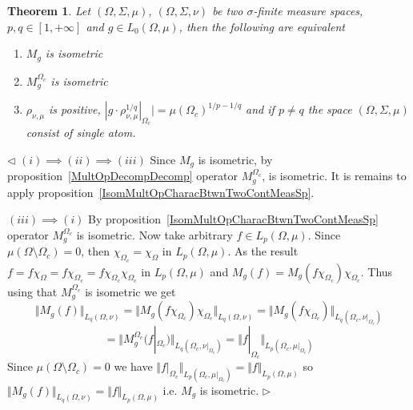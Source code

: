 \documentclass[12pt]{article}
\newtheorem{theorem}{Theorem}[subsection]
\newenvironment{proof}{\par $\triangleleft$}{$\triangleright$}
\begin{document}
\begin{theorem}\label{IsomMultOpCharacBtwnTwoMeasSp}
    Let $(\Omega,\Sigma,\mu)$, $(\Omega,\Sigma,\nu)$ be two $\sigma$-finite
    measure spaces, $p,q\in[1,+\infty]$ and $g\in L_0(\Omega,\mu)$, then the
    following are equivalent
    \begin{enumerate}[label = (\roman*)]
        \item $M_g$ is isometric

        \item $M_g^{\Omega_c}$ is isometric

        \item $\rho_{\nu,\mu}$ is positive,
              $|g\cdot \rho_{\nu,\mu}^{1/q}|_{\Omega_c}|={\mu(\Omega_c)}^{1/p-1/q}$
              and if  $p\neq q$ the space $(\Omega,\Sigma,\mu)$ consist
              of single atom.
    \end{enumerate}
\end{theorem}
\begin{proof}
    $(i)\implies (ii)\implies (iii)$ Since $M_g$ is isometric, by
    proposition~\ref{MultOpDecompDecomp} operator $M_g^{\Omega_c}$, is
    isometric. It is remains to apply
    proposition~\ref{IsomMultOpCharacBtwnTwoContMeasSp}.

    $(iii)\implies (i)$ By proposition~\ref{IsomMultOpCharacBtwnTwoContMeasSp}
    operator $M_g^{\Omega_c}$ is isometric. Now take arbitrary
    $f\in L_p(\Omega,\mu)$. Since $\mu(\Omega\setminus\Omega_c)=0$,
    then $\chi_{\Omega_c}=\chi_{\Omega}$ in $L_p(\Omega,\mu)$. As the
    result $f=f\chi_{\Omega}=f\chi_{\Omega_c}=f\chi_{\Omega_c}\chi_{\Omega_c}$
    in $L_p(\Omega,\mu)$ and $M_g(f)=M_g(f\chi_{\Omega_c})\chi_{\Omega_c}$.
    Thus using that $M_g^{\Omega_c}$ is isometric we get
    $$
        \Vert M_g(f)\Vert_{L_q(\Omega,\nu)} =\Vert
        M_g(f\chi_{\Omega_c})\chi_{\Omega_c}\Vert_{L_q(\Omega,\nu)} =\Vert
        M_g(f\chi_{\Omega_c})\Vert_{L_q(\Omega_c,\nu|_{\Omega_c})}
    $$
    $$
        =\Vert
        M_g^{\Omega_c}(f|_{\Omega_c})\Vert_{L_q(\Omega_c,\nu|_{\Omega_c})}
        =\Vert f|_{\Omega_c}\Vert_{L_p(\Omega_c,\mu|_{\Omega_c})}
    $$
    Since $\mu(\Omega\setminus\Omega_c)=0$ we have
    $\Vert f|_{\Omega_c}\Vert_{L_p(\Omega_c,\mu|_{\Omega_c})}
        =\Vert f\Vert_{L_p(\Omega,\mu)}$ so $\Vert M_g(f)\Vert_{L_q(\Omega,\nu)}
        =\Vert f\Vert_{L_p(\Omega,\mu)}$ i.e.  $M_g$ is isometric.
\end{proof}
\end{document}
